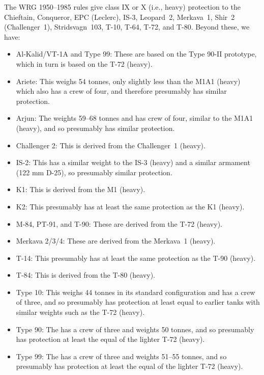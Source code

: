 {    
    The WRG 1950--1985 rules give class IX or X (i.e., heavy) protection to the
    Chieftain,
    Conqueror,
    EPC (Leclerc),
    IS-3,
    Leopard~2,
    Merkava~1,
    Shir~2 (Challenger~1),
    Stridsvagn~103,
    T-10,
    T-64,
    T-72, and
    T-80.
    Beyond these, we have:
    \begin{itemize}
        \item Al-Kalid/VT-1A and Type 99: These are based on the Type 90-II prototype, which in turn is based on the T-72 (heavy).
        \item Ariete: This weighs 54 tonnes, only slightly less than the M1A1 (heavy) which also has a crew of four, and therefore presumably has similar protection.
        \item Arjun: The weights 59--68 tonnes and has crew of four, similar to the M1A1 (heavy), and so presumably has similar protection.
        \item Challenger 2: This is derived from the Challenger~1 (heavy).
        \item IS-2: This has a similar weight to the IS-3 (heavy) and a similar armament (122 mm D-25), so presumably similar protection.
        \item K1: This is derived from the M1 (heavy).
        \item K2: This presumably has at least the same protection as the K1 (heavy).
        \item M-84, PT-91, and T-90: These are derived from the T-72 (heavy).
        \item Merkava 2/3/4: These are derived from the Merkava~1 (heavy).
        \item T-14: This presumably has at least the same protection as the T-90 (heavy).
        \item T-84: This is derived from the T-80 (heavy).
        \item Type 10: This weighs 44 tonnes in its standard configuration and has a crew of three, and so presumably has protection at least equal to earlier tanks with similar weights such as the T-72 (heavy).
        \item Type 90: The has a crew of three and weights 50 tonnes, and so presumably has protection at least the equal of the lighter T-72 (heavy).
        \item Type 99: The has a crew of three and weights 51--55 tonnes, and so presumably has protection at least the equal of the lighter T-72 (heavy).
    \end{itemize}
}
